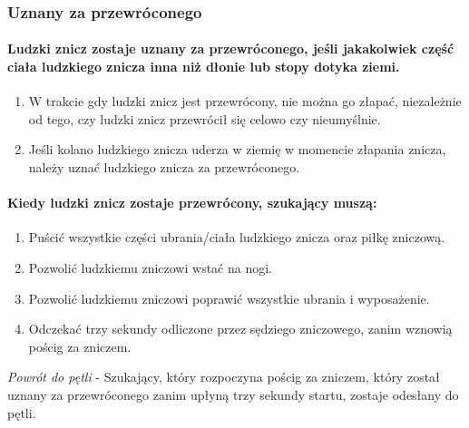 \documentclass[12pt]{article}
\begin{document}
\subsubsection{Uznany za przewróconego}

\paragraph{Ludzki znicz zostaje uznany za przewróconego, jeśli
	jakakolwiek część ciała ludzkiego znicza inna niż dłonie lub stopy
	dotyka ziemi.}

\begin{enumerate}
	\item W trakcie gdy ludzki znicz jest przewrócony, nie można go złapać,
	      niezależnie od tego, czy ludzki znicz przewrócił się celowo czy
	      nieumyślnie.

	\item Jeśli kolano ludzkiego znicza uderza w ziemię w momencie złapania
	      znicza, należy uznać ludzkiego znicza za przewróconego.
\end{enumerate}

\paragraph{Kiedy ludzki znicz zostaje przewrócony, szukający
	muszą:}

\begin{enumerate}
	\item Puścić wszystkie części ubrania/ciała ludzkiego znicza oraz piłkę
	      zniczową.

	\item Pozwolić ludzkiemu zniczowi wstać na nogi.

	\item Pozwolić ludzkiemu zniczowi poprawić wszystkie ubrania i wyposażenie.

	\item Odczekać trzy sekundy odliczone przez sędziego zniczowego, zanim
	      wznowią pościg za zniczem.
\end{enumerate}

\emph{Powrót do pętli} - Szukający, który rozpoczyna pościg za zniczem,
który został uznany za przewróconego zanim upłyną trzy sekundy startu,
zostaje odesłany do pętli.
\end{document}
